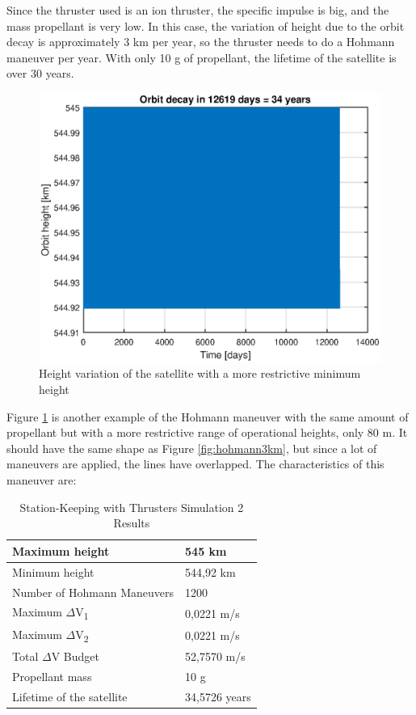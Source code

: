 \noindent
Since the thruster used is an ion thruster, the specific impulse is big, and the mass propellant is very low. In this case, the variation of height due to the orbit decay is approximately 3 km per year, so the thruster needs to do a Hohmann maneuver per year. With only 10 g of propellant, the lifetime of the satellite is over 30 years.

\begin{figure}[h]
\centerline{\includegraphics[scale=1]{ThrustersDrag/thrust80m.eps}}
\caption{Height variation of the satellite with a more restrictive minimum height}
\label{fig:hohmann80m}
\end{figure}

Figure \ref{fig:hohmann80m} is another example of the Hohmann maneuver with the same amount of propellant but with a more restrictive range of operational heights, only 80 m. It should have the same shape as Figure \ref{fig:hohmann3km}, but since a lot of maneuvers are applied, the lines have overlapped. The characteristics of this maneuver are:

\begin{table}
\begin{center}
\begin{tabular}{ | l | l | }
\hline
Maximum height & 545 km \\
\hline
Minimum height & 544,92 km \\
\hline
Number of Hohmann Maneuvers & 1200 \\
\hline
Maximum $\Delta$V\textsubscript{1} & 0,0221 m/s \\
\hline
Maximum $\Delta$V\textsubscript{2} & 0,0221 m/s \\
\hline
Total $\Delta$V Budget & 52,7570 m/s \\ 
\hline 
Propellant mass & 10 g \\
\hline
Lifetime of the satellite & 34,5726 years \\
\hline
\end{tabular}
\caption{Station-Keeping with Thrusters Simulation 2 Results}
\end{center}
\end{table}


